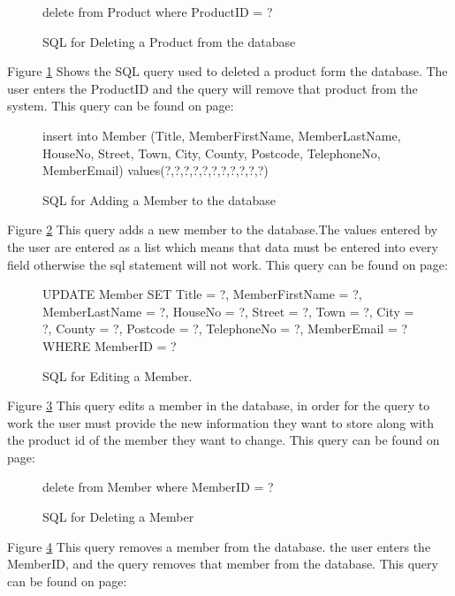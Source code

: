 \begin{figure}[H]
	 \caption{SQL for Deleting a Product from the database} \label{fig:delete-product-sql}
\begin{sql} 
delete from Product where ProductID = ?
\end{sql}
\end{figure}
Figure \ref{fig:delete-product-sql} Shows the SQL query used to deleted a product form the database. The user enters the ProductID and the query will remove that product from the system. This query can be found on page: 

\begin{figure}[H]
	 \caption{SQL for Adding a Member to the database} \label{fig:add-member-sql}
\begin{sql} 
insert into Member (Title, MemberFirstName, MemberLastName, HouseNo, Street, Town, City, County, Postcode, TelephoneNo, MemberEmail) values(?,?,?,?,?,?,?,?,?,?,?)
 \end{sql}
\end{figure}
Figure \ref{fig:add-member-sql} This query adds a new member to the database.The values entered by the user are entered as a list which means that data must be entered into every field otherwise the sql statement will not work. This query can be found on page:

\begin{figure}[H]
	 \caption{SQL for Editing a Member.} \label{fig:edit-member-sql}
\begin{sql} 
UPDATE Member SET Title = ?,
                                   MemberFirstName = ?,
                                   MemberLastName = ?,
                                   HouseNo = ?,
                                   Street = ?,
                                   Town = ?,
                                   City = ?,
                                   County = ?,
                                   Postcode = ?,
                                   TelephoneNo = ?,
                                   MemberEmail = ?
                                   WHERE MemberID = ?
\end{sql}
\end{figure}
Figure \ref{fig:edit-member-sql} This query edits a member in the database, in order for the query to work the user must provide the new information they want to store along with the product id of the member they want to change.  This query can be found on page: 


\begin{figure}[H]
	 \caption{SQL for Deleting a Member} \label{fig:delete-member-sql}
\begin{sql}
delete from Member where MemberID = ?
\end{sql}
\end{figure}
Figure \ref{fig:delete-member-sql} This query removes a member from the database. the user enters the MemberID, and the query removes that member from the database. This query can be found on page:


